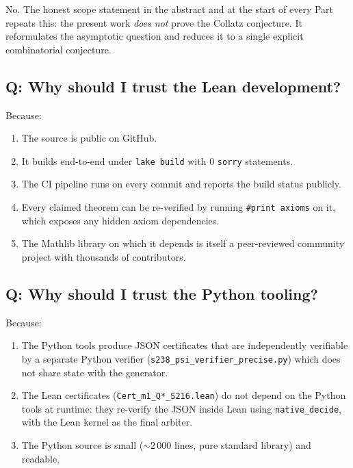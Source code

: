 \documentclass[11pt,a4paper]{article}
\theoremstyle{plain}
\theoremstyle{definition}
\begin{document}
No. The honest scope statement in the abstract and at the start
of every Part repeats this: the present work \emph{does not} prove
the Collatz conjecture. It reformulates the asymptotic question
and reduces it to a single explicit combinatorial conjecture.

\subsection*{Q: Why should I trust the Lean development?}

Because:
\begin{enumerate}
   \item The source is public on GitHub.
   \item It builds end-to-end under \texttt{lake build} with
         \textbf{$0$} \texttt{sorry} statements.
   \item The CI pipeline runs on every commit and reports the
         build status publicly.
   \item Every claimed theorem can be re-verified by running
         \texttt{\#print axioms} on it, which exposes any hidden
         axiom dependencies.
   \item The Mathlib library on which it depends is itself a
         peer-reviewed community project with thousands of
         contributors.
\end{enumerate}

\subsection*{Q: Why should I trust the Python tooling?}

Because:
\begin{enumerate}
   \item The Python tools produce JSON certificates that are
         independently verifiable by a separate Python verifier
         (\texttt{s238\_psi\_verifier\_precise.py}) which does
         not share state with the generator.
   \item The Lean certificates (\texttt{Cert\_m1\_Q*\_S216.lean})
         do not depend on the Python tools at runtime: they
         re-verify the JSON inside Lean using
         \texttt{native\_decide}, with the Lean kernel as the
         final arbiter.
   \item The Python source is small ($\sim 2\,000$ lines, pure
         standard library) and readable.
\end{enumerate}
\end{document}
